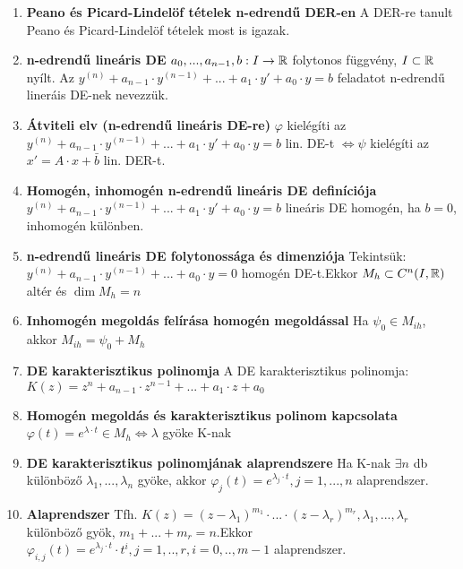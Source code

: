 \documentclass{article}
\begin{document}
\begin{enumerate}
	\item\textbf{Peano és Picard-Lindelöf tételek n-edrendű DER-en}\br
	A DER-re tanult Peano és Picard-Lindelöf tételek most is igazak.
	
	\item\textbf{n-edrendű lineáris DE}\br
	$a_0,...,a_{n-1}, b:I\rightarrow\mathbb{R}$ folytonos függvény, $I\subset\mathbb{R}$ nyílt.\br
	Az $y^{(n)}+a_{n-1}\cdot y^{(n-1)}+...+a_1\cdot y'+a_0\cdot y=b$ feladatot
	n-edrendű lineráis DE-nek nevezzük.
	
	\item\textbf{Átviteli elv (n-edrendű lineáris DE-re)}\br
	$\varphi$ kielégíti az $y^{(n)}+a_{n-1}\cdot y^{(n-1)}+...+a_1\cdot y'+a_0\cdot y=b$
	lin. DE-t $\Leftrightarrow\psi$ kielégíti az\br$x'=A\cdot x+\bar{b}$ lin. DER-t.
	
	\item\textbf{Homogén, inhomogén n-edrendű lineáris DE definíciója}\br
	$y^{(n)}+a_{n-1}\cdot y^{(n-1)}+...+a_1\cdot y'+a_0\cdot y = b$ lineáris DE
	homogén, ha $b=0$, inhomogén különben.
	
	\item\textbf{n-edrendű lineáris DE folytonossága és dimenziója}\br
	Tekintsük: $y^{(n)}+a_{n-1}\cdot y^{(n-1)}+...+a_0\cdot y=0$
	homogén DE-t.\br Ekkor $M_h\subset C^n (I, \mathbb{R})$ altér és $\dim M_h=n$
	
	\item\textbf{Inhomogén megoldás felírása homogén megoldással}\br
	Ha $\psi_0\in M_{ih}$, akkor $M_{ih}=\psi_0+M_h$
	
	\item\textbf{DE karakterisztikus polinomja}\br
	A DE karakterisztikus polinomja: $K(z)=z^n+a_{n-1}\cdot z^{n-1}+...+a_1
	\cdot z+a_0$
	
	\item\textbf{Homogén megoldás és karakterisztikus polinom kapcsolata}\br
	$\varphi(t)=e^{\lambda\cdot t}\in M_h \Leftrightarrow\lambda$ gyöke K-nak
	
	\item\textbf{DE karakterisztikus polinomjának alaprendszere}\br
	Ha K-nak $\exists n$ db különböző $\lambda_1, ... , \lambda_n$ gyöke, akkor
	$\varphi_{j}(t)=e^{\lambda_j\cdot t},j=1,...,n$ alaprendszer.
	
	\item\textbf{Alaprendszer}\br
	Tfh. $K(z)=(z-\lambda_1)^{m_1}\cdot...\cdot(z-\lambda_r)^{m_r},\lambda_1,
	... ,\lambda_r$ különböző gyök, $m_1 + ... + m_r = n$.\br Ekkor
	$\varphi_{i,j}(t)=e^{\lambda_j\cdot t}\cdot t^i,j=1,..,r,i=0,..,m-1$
	alaprendszer.
	

\end{enumerate}
\end{document}
